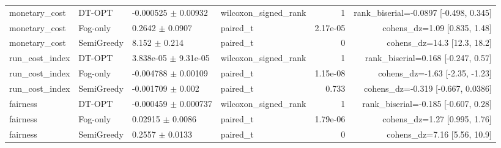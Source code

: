 \begin{table}[t]
\begin{tabular}{llllrr}
monetary\_cost & DT-OPT & -0.000525 $\pm$ 0.00932 & wilcoxon\_signed\_rank & 1 & rank\_biserial=-0.0897 [-0.498, 0.345] \\
monetary\_cost & Fog-only & 0.2642 $\pm$ 0.0907 & paired\_t & 2.17e-05 & cohens\_dz=1.09 [0.835, 1.48] \\
monetary\_cost & SemiGreedy & 8.152 $\pm$ 0.214 & paired\_t & 0 & cohens\_dz=14.3 [12.3, 18.2] \\
run\_cost\_index & DT-OPT & 3.838e-05 $\pm$ 9.31e-05 & wilcoxon\_signed\_rank & 1 & rank\_biserial=0.168 [-0.247, 0.57] \\
run\_cost\_index & Fog-only & -0.004788 $\pm$ 0.00109 & paired\_t & 1.15e-08 & cohens\_dz=-1.63 [-2.35, -1.23] \\
run\_cost\_index & SemiGreedy & -0.001709 $\pm$ 0.002 & paired\_t & 0.733 & cohens\_dz=-0.319 [-0.667, 0.0386] \\
fairness & DT-OPT & -0.000459 $\pm$ 0.000737 & wilcoxon\_signed\_rank & 1 & rank\_biserial=-0.185 [-0.607, 0.28] \\
fairness & Fog-only & 0.02915 $\pm$ 0.0086 & paired\_t & 1.79e-06 & cohens\_dz=1.27 [0.995, 1.76] \\
fairness & SemiGreedy & 0.2557 $\pm$ 0.0133 & paired\_t & 0 & cohens\_dz=7.16 [5.56, 10.9] \\
\bottomrule
\end{tabular}
\end{table}


